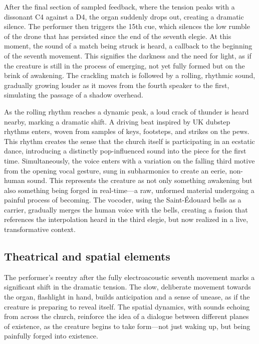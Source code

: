 \documentclass[12pt,twoside,maitrise]{dms_ks}
\theoremstyle{definition}
\begin{document}
{

After the final section of sampled feedback, where the tension peaks with a dissonant C4 against a D4, the organ suddenly drops out, creating a dramatic silence. 
The performer then triggers the 15th cue, which silences the low rumble of the drone that has persisted since the end of the seventh elegie. 
At this moment, the sound of a match being struck is heard, a callback to the beginning of the seventh movement. 
This signifies the darkness and the need for light, as if the creature is still in the process of emerging, not yet fully formed but on the brink of awakening. 
The crackling match is followed by a rolling, rhythmic sound, gradually growing louder as it moves from the fourth speaker to the first, simulating the passage of a shadow overhead.

As the rolling rhythm reaches a dynamic peak, a loud crack of thunder is heard nearby, marking a dramatic shift. 
A driving beat inspired by UK dubstep rhythms enters, woven from samples of keys, footsteps, and strikes on the pews. 
This rhythm creates the sense that the church itself is participating in an ecstatic dance, introducing a distinctly pop-influenced sound into the piece for the first time. 
Simultaneously, the voice enters with a variation on the falling third motive from the opening vocal gesture, sung in subharmonics to create an eerie, non-human sound. 
This represents the creature as not only something awakening but also something being forged in real-time—a raw, unformed material undergoing a painful process of becoming. 
The vocoder, using the Saint-Édouard bells as a carrier, gradually merges the human voice with the bells, creating a fusion that references the interpolation heard in the third elegie, but now realized in a live, transformative context.


\subsection{Theatrical and spatial elements}

The performer’s reentry after the fully electroacoustic seventh movement marks a significant shift in the dramatic tension. 
The slow, deliberate movement towards the organ, flashlight in hand, builds anticipation and a sense of unease, as if the creature is preparing to reveal itself. 
The spatial dynamics, with sounds echoing from across the church, reinforce the idea of a dialogue between different planes of existence, as the creature begins to take form—not just waking up, but being painfully forged into existence.

}
\end{document}
